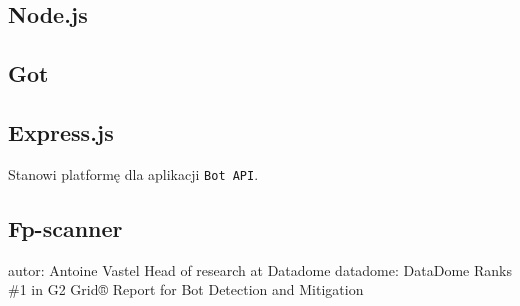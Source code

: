  

\subsection{Node.js}\label{subsec:nodejs}

 

\subsection{Got}\label{subsec:got}

 

\subsection{Express.js}\label{subsec:express.js}

  Stanowi platformę dla aplikacji \texttt{Bot API}.

\subsection{Fp-scanner}\label{subsec:fp-scanner}
autor: Antoine Vastel Head of research at Datadome
datadome: DataDome Ranks \#1 in G2 Grid® Report for Bot Detection and Mitigation